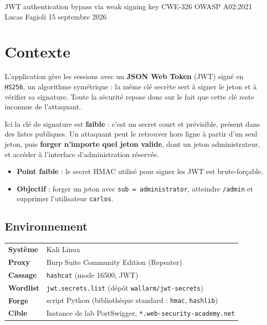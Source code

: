 \documentclass[11pt,a4paper]{article}
\begin{document}
\makecover
  {JWT authentication bypass via weak signing key}
  {CWE-326 \textperiodcentered{} OWASP A02\string:2021}
  {
  }
  {Lucas Fagioli}
  {15 septembre 2026}

\section{Contexte}
L'application gère les sessions avec un \textbf{JSON Web Token} (JWT) signé en
\texttt{HS256}, un algorithme symétrique : la même clé secrète sert à signer le
jeton et à vérifier sa signature. Toute la sécurité repose donc sur le fait que
cette clé reste inconnue de l'attaquant.

Ici la clé de signature est \textbf{faible} : c'est un secret court et
prévisible, présent dans des listes publiques. Un attaquant peut le retrouver
hors ligne à partir d'un seul jeton, puis \textbf{forger n'importe quel jeton
valide}, dont un jeton administrateur, et accéder à l'interface
d'administration réservée.

\begin{itemize}
  \item \textbf{Point faible} : le secret HMAC utilisé pour signer les JWT est brute-forçable.
  \item \textbf{Objectif} : forger un jeton avec \texttt{sub = administrator}, atteindre \texttt{/admin} et supprimer l'utilisateur \texttt{carlos}.
\end{itemize}

\subsection{Environnement}
\renewcommand{\arraystretch}{1.3}
\begin{tabular}{@{}p{}p{}@{}}
  \textbf{Système}        & Kali Linux \\
  \textbf{Proxy}          & Burp Suite Community Edition (Repeater) \\
  \textbf{Cassage}        & \texttt{hashcat} (mode 16500, JWT) \\
  \textbf{Wordlist}       & \texttt{jwt.secrets.list} (dépôt \texttt{wallarm/jwt-secrets}) \\
  \textbf{Forge}          & script Python (bibliothèque standard : \texttt{hmac}, \texttt{hashlib}) \\
  \textbf{Cible}          & Instance de lab PortSwigger, \texttt{*.web-security-academy.net} \\
\end{tabular}
\end{document}
